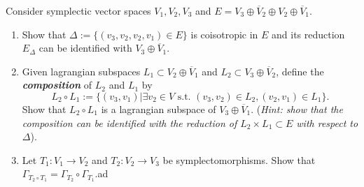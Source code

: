 Consider symplectic vector spaces  $V_1,V_2,V_3$ and $E=V_3\oplus \overline{ V}_{2}\oplus V_2\oplus \overline{V}_1$.
\begin{enumerate}[label=\alph*.]
	\item Show that $\Delta :=\{(v_3,v_2,v_2,v_1)\in E\} $ is coisotropic in $E$ and its reduction $E_{\Delta}$ can be identified with $V_3\oplus \overline{V}_{1}$.

	\item Given lagrangian subspaces $L_1\subset V_2\oplus \overline{V}_{1}$ and $L_2\subset  V_3\oplus \overline{V}_{2}$, define the \textit{\textbf{composition}} of $L_2$ and $L_1$ by
		\[L_2\circ L_1:=\{(v_3,v_1)|\exists v_2\in V\text{ s.t. } (v_3,v_2)\in L_2,(v_2,v_1)\in L_1\}. \]
		Show that $L_2\circ L_1$ is a lagrangian subspace of $V_3\oplus \overline{V}_{1}$. (\textit{Hint: show that the composition can be identified with the reduction of $L_2\times L_1\subset E$ with respect to $\Delta$}).

	\item Let $T_1:V_1\to V_2$ and  $T_2:V_2\to V_3$ be symplectomorphisms. Show that $\Gamma_{T_2\circ T_1}=\Gamma_{T_2}\circ \Gamma_{T_1}$.ad
\end{enumerate}

